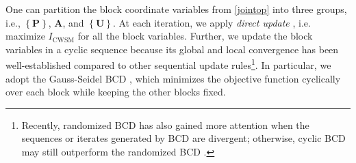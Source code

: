 \documentclass[10pt,journal]{IEEEtran}
\newcommand{\braces}[1]{{\left\{ {#1}\right\}}}
\theoremstyle{definition}
\begin{document}
One can partition the block coordinate variables from \eqref{jointop} into three groups, i.e., $\braces{\mathbf{P}}$, $\mathbf{A}$, and $\braces{\mathbf{U}}$. %
At each iteration, we apply \textit{direct update} \cite{BCDconvergence}, i.e. maximize %
$I_{\textrm{CWSM}}$ for all the block variables. %
Further, we update the block variables in a cyclic sequence because its global and local convergence has been well-established \cite{BCDconvergence,Lops2019serveillance} 
compared to other sequential update rules\footnote{Recently, randomized BCD has also gained more attention when the sequences or iterates generated by BCD are divergent; otherwise, cyclic BCD may still outperform the randomized BCD \cite{ADMMBCD}.}. In particular, we adopt the Gauss-Seidel BCD \cite{BCDconvergence}, which minimizes the objective function cyclically over each block while keeping the other blocks fixed. 
\end{document}
